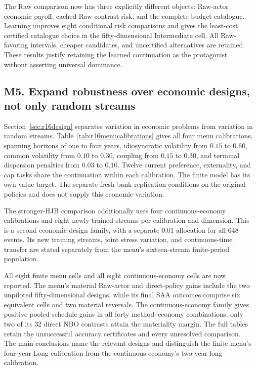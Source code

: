 The Raw comparison now has three explicitly different objects: Raw-actor economic payoff, cached-Raw contrast risk, and the complete budget catalogue. Learning improves eight conditional risk comparisons and gives the least-cost certified catalogue choice in the fifty-dimensional Intermediate cell. All Raw-favoring intervals, cheaper candidates, and uncertified alternatives are retained. These results justify retaining the learned continuation as the protagonist without asserting universal dominance.

\subsection*{M5. Expand robustness over economic designs, not only random streams}\label{resp:M5}
Section~\ref{sec:r16design} separates variation in economic problems from variation in random streams. Table~\ref{tab:r16menucalibrations} gives all four menu calibrations, spanning horizons of one to four years, idiosyncratic volatility from $0.15$ to $0.60$, common volatility from $0.10$ to $0.30$, coupling from $0.15$ to $0.30$, and terminal dispersion penalties from $0.03$ to $0.10$. Twelve current preference, externality, and cap tasks share the continuation within each calibration. The finite model has its own value target. The separate fresh-bank replication conditions on the original policies and does not supply this economic variation.

The stronger-HJB comparison additionally uses four continuous-economy calibrations and eight newly trained streams per calibration and dimension. This is a second economic design family, with a separate $0.01$ allocation for all 648 events. Its new training streams, joint stress variation, and continuous-time transfer are stated separately from the menu's sixteen-stream finite-period population.

All eight finite menu cells and all eight continuous-economy cells are now reported. The menu's material Raw-actor and direct-policy gains include the two unpiloted fifty-dimensional designs, while its final SAA outcomes comprise six equivalent cells and two material reversals. The continuous-economy family gives positive pooled schedule gains in all forty method--economy combinations; only two of its 32 direct NBO contrasts attain the materiality margin. The full tables retain the unsuccessful accuracy certificates and every unresolved comparison. The main conclusions name the relevant designs and distinguish the finite menu's four-year Long calibration from the continuous economy's two-year long calibration.


